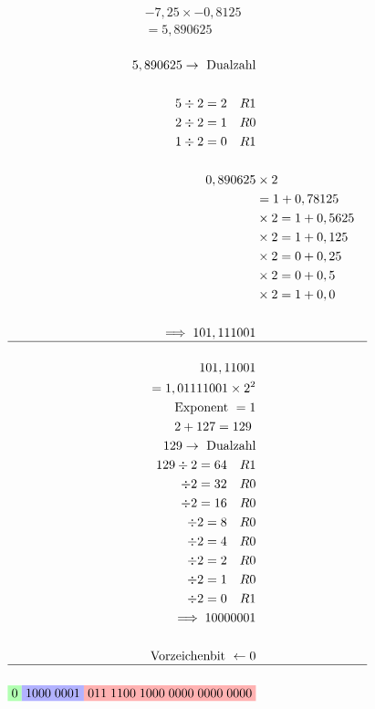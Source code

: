 \documentclass[a4paper]{scrartcl}
\begin{document}
			\begin{align*}
			&-7,25 \times -0,8125\\
			&= 5,890625\\
			\end{align*}
			
			\begin{align*}
			5,890625 \rightarrow \text{ Dualzahl}\\
			\\
			5 \div 2 = 2 \quad R 1\\
			2 \div 2 = 1 \quad R 0\\
			1 \div 2 = 0 \quad R 1\\
			\\
			0,890625 &\times 2\\ 
			&= 1+ 0,78125\\
			&\times 2 = 1 + 0,5625\\ 
			&\times 2 = 1 + 0,125\\ 
			&\times 2 = 0 + 0,25\\ 
			&\times 2 = 0 + 0,5\\ 
			&\times 2 = 1 + 0,0\\ 
			\\
			\implies 101,111001\\\hline
			\\
			101,11001\\
			= 1,01111001 \times 2^{2}\\
			\text{Exponent } = 1\\
			2 + 127 = 129\
			\\
			129 \rightarrow \text{ Dualzahl}\\
			129\div 2 = 64 \quad R1\\
			\div 2 = 32 \quad R0\\
			\div 2 = 16 \quad R0\\
			\div 2 = 8 \quad R0\\
			\div 2 = 4 \quad R0\\
			\div 2 = 2 \quad R0\\
			\div 2 = 1 \quad R0\\
			\div 2 = 0 \quad R1\\
			\implies 10000001\\
			\\
			\text{Vorzeichenbit } \gets 0\\ \hline
			\\ 
			\colorbox{green!30}{$0$} \colorbox{blue!30}{$1000 \; 0001$} \colorbox{red!30}{$011\; 1100\; 1000\; 0000\; 0000\; 0000$}\\
			\end{align*}
\end{document}
